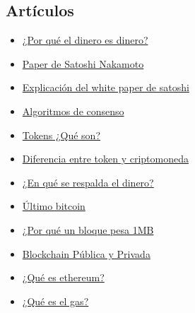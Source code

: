\documentclass[a4paper,12pt]{lib/pub}
\begin{document}
\subsection{Artículos}
\begin{itemize}
	\item \href{https://cryptocoinunexpo.wordpress.com/2018/08/10/por-que-el-dinero-es-dinero/}{¿Por qué el dinero es dinero?}
	\item \href{https://bitcoin.org/files/bitcoin-paper/bitcoin\_es\_latam.pdf}{Paper de Satoshi Nakamoto}
	\item \href{https://medium.com/coinmonks/bitcoin-white-paper-explained-part-1-4-16cba783146a}{Explicación del white paper de satoshi}
	\item \href{https://101blockchains.com/es/algoritmos-de-consenso-blockchain/}{Algoritmos de consenso}
	\item \href{https://www.criptonoticias.com/mercados/que-son-tokens-como-diferencian-criptomonedas/}{Tokens ¿Qué son?}
	\item \href{https://medium.com/@LatamBlock/la-diferencia-entre-un-token-y-una-criptomoneda-673a977e16be}{Diferencia entre token y criptomoneda}
	\item \href{https://www.europapress.es/economia/noticia-llevamos-45-anos-utilizando-dinero-fiat-sabes-20160221084939.html}{¿En qué se respalda el dinero?}
	\item \href{https://es.cointelegraph.com/news/experts-indicate-that-the-last-bitcoin-will-be-mined-in-the-year-2140}{Último bitcoin}
	\item \href{https://es.cointelegraph.com/news/satoshis-best-kept-secret-why-is-there-a-1-mb-limit-to-bitcoin-block-size}{¿Por qué un bloque pesa 1MB}
	\item \href{https://medium.com/@marvin.soto/blockchain-público-vs-blockchain-privado-cuál-es-la-diferencia-8115be4a593b}{Blockchain Pública y Privada}
	\item \href{https://hipertextual.com/2017/12/que-es-ethereum-que-ofrece-respecto-otras-criptomonedas
	}{¿Qué es ethereum?}
	\item \href{https://medium.com/astec/entendiendo-el-gas-en-ethereum-e77a6f30090f}{¿Qué es el gas?}
\end{itemize}
\end{document}

